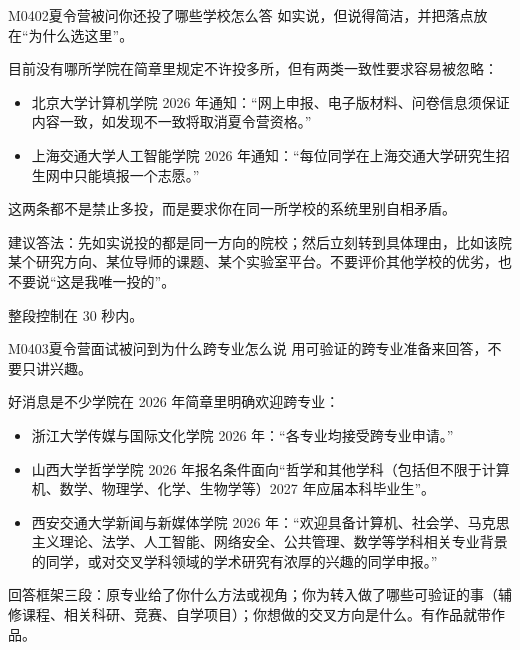 \begin{qa}{M0402}{夏令营被问你还投了哪些学校怎么答}
如实说，但说得简洁，并把落点放在“为什么选这里”。

目前没有哪所学院在简章里规定不许投多所，但有两类一致性要求容易被忽略：
\begin{itemize}
  \item 北京大学计算机学院 2026 年通知：“网上申报、电子版材料、问卷信息须保证内容一致，如发现不一致将取消夏令营资格。”
  \item 上海交通大学人工智能学院 2026 年通知：“每位同学在上海交通大学研究生招生网中只能填报一个志愿。”
\end{itemize}

这两条都不是禁止多投，而是要求你在同一所学校的系统里别自相矛盾。

建议答法：先如实说投的都是同一方向的院校；然后立刻转到具体理由，比如该院某个研究方向、某位导师的课题、某个实验室平台。不要评价其他学校的优劣，也不要说“这是我唯一投的”。

整段控制在 30 秒内。
\end{qa}

\begin{qa}{M0403}{夏令营面试被问到为什么跨专业怎么说}
用可验证的跨专业准备来回答，不要只讲兴趣。

好消息是不少学院在 2026 年简章里明确欢迎跨专业：
\begin{itemize}
  \item 浙江大学传媒与国际文化学院 2026 年：“各专业均接受跨专业申请。”
  \item 山西大学哲学学院 2026 年报名条件面向“哲学和其他学科（包括但不限于计算机、数学、物理学、化学、生物学等）2027 年应届本科毕业生”。
  \item 西安交通大学新闻与新媒体学院 2026 年：“欢迎具备计算机、社会学、马克思主义理论、法学、人工智能、网络安全、公共管理、数学等学科相关专业背景的同学，或对交叉学科领域的学术研究有浓厚的兴趣的同学申报。”
\end{itemize}

回答框架三段：原专业给了你什么方法或视角；你为转入做了哪些可验证的事（辅修课程、相关科研、竞赛、自学项目）；你想做的交叉方向是什么。有作品就带作品。
\end{qa}

